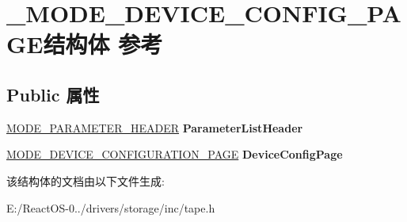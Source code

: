 \hypertarget{struct___m_o_d_e___d_e_v_i_c_e___c_o_n_f_i_g___p_a_g_e}{}\section{\+\_\+\+M\+O\+D\+E\+\_\+\+D\+E\+V\+I\+C\+E\+\_\+\+C\+O\+N\+F\+I\+G\+\_\+\+P\+A\+G\+E结构体 参考}
\label{struct___m_o_d_e___d_e_v_i_c_e___c_o_n_f_i_g___p_a_g_e}
\subsection*{Public 属性}
\begin{DoxyCompactItemize}
\item 
\mbox{\label{struct___m_o_d_e___d_e_v_i_c_e___c_o_n_f_i_g___p_a_g_e_a683e7b4a199d7608efd04ad8e46fb455}} 
\hyperlink{struct___m_o_d_e___p_a_r_a_m_e_t_e_r___h_e_a_d_e_r}{M\+O\+D\+E\+\_\+\+P\+A\+R\+A\+M\+E\+T\+E\+R\+\_\+\+H\+E\+A\+D\+ER} {\bfseries Parameter\+List\+Header}
\item 
\mbox{\label{struct___m_o_d_e___d_e_v_i_c_e___c_o_n_f_i_g___p_a_g_e_aa83636dc7945cfd4370e04d556c69f0d}} 
\hyperlink{struct___m_o_d_e___d_e_v_i_c_e___c_o_n_f_i_g_u_r_a_t_i_o_n___p_a_g_e}{M\+O\+D\+E\+\_\+\+D\+E\+V\+I\+C\+E\+\_\+\+C\+O\+N\+F\+I\+G\+U\+R\+A\+T\+I\+O\+N\+\_\+\+P\+A\+GE} {\bfseries Device\+Config\+Page}
\end{DoxyCompactItemize}


该结构体的文档由以下文件生成\+:\begin{DoxyCompactItemize}
\item 
E\+:/\+React\+O\+S-\/0../drivers/storage/inc/tape.\+h\end{DoxyCompactItemize}
